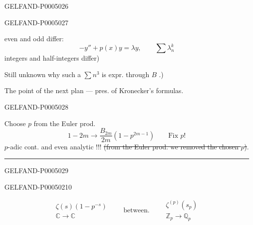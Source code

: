 \begin{GelfandAdjacentEvidence}{GELFAND-P000502}{6}

\end{GelfandAdjacentEvidence}
\begin{GelfandAdjacentEvidence}{GELFAND-P000502}{7}


even and odd differ:
\[
-y''+p(x)y=\lambda y,\qquad \sum\lambda_n^k
\]
integers and half-integers differ)

Still unknown why such a $\sum n^3$ is expr. through $B$ .)

The point of the next plan — pres. of Kronecker’s formulas.
\end{GelfandAdjacentEvidence}
\begin{GelfandAdjacentEvidence}{GELFAND-P000502}{8}

Choose $p$ from the Euler prod.
\[
1-2m\longrightarrow\frac{B_{2m}}{2m}(1-p^{2m-1})
\qquad\text{Fix }p!
\]
$p$-adic cont. and even analytic !!!
\sout{(from the Euler prod. we removed the chosen \mbox{$p$})}.
\par\smallskip\hrule\smallskip
{}
\end{GelfandAdjacentEvidence}
\begin{GelfandAdjacentEvidence}{GELFAND-P000502}{9}

\end{GelfandAdjacentEvidence}
\begin{GelfandAdjacentEvidence}{GELFAND-P000502}{10}


\[
\begin{gathered}
\zeta(s)(1-p^{-s})\\
\mathbb C\longrightarrow\mathbb C
\end{gathered}
\qquad\text{between.}\qquad
\begin{gathered}
\zeta^{(p)}(s_p)\\
\mathbb Z_p\longrightarrow\mathbb Q_p
\end{gathered}
\]
\end{GelfandAdjacentEvidence}
